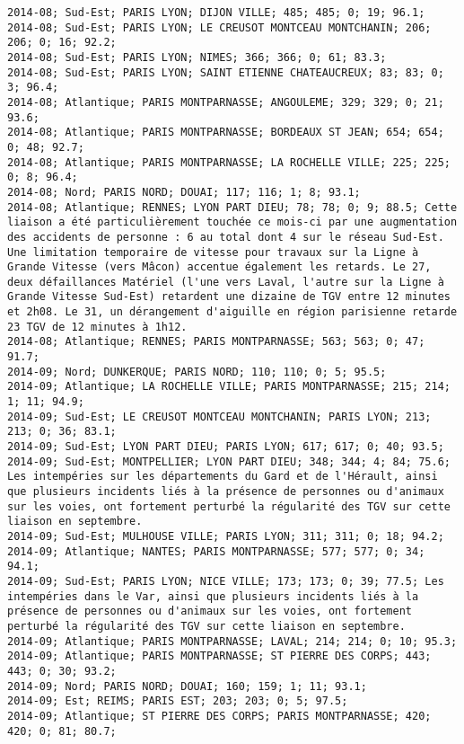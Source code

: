 \documentclass{article}
\begin{document}
\begin{Verbatim}[commandchars=\\\{\}]
2014-08; Sud-Est; PARIS LYON; DIJON VILLE; 485; 485; 0; 19; 96.1; 
2014-08; Sud-Est; PARIS LYON; LE CREUSOT MONTCEAU MONTCHANIN; 206; 206; 0; 16; 92.2; 
2014-08; Sud-Est; PARIS LYON; NIMES; 366; 366; 0; 61; 83.3; 
2014-08; Sud-Est; PARIS LYON; SAINT ETIENNE CHATEAUCREUX; 83; 83; 0; 3; 96.4; 
2014-08; Atlantique; PARIS MONTPARNASSE; ANGOULEME; 329; 329; 0; 21; 93.6; 
2014-08; Atlantique; PARIS MONTPARNASSE; BORDEAUX ST JEAN; 654; 654; 0; 48; 92.7; 
2014-08; Atlantique; PARIS MONTPARNASSE; LA ROCHELLE VILLE; 225; 225; 0; 8; 96.4; 
2014-08; Nord; PARIS NORD; DOUAI; 117; 116; 1; 8; 93.1; 
2014-08; Atlantique; RENNES; LYON PART DIEU; 78; 78; 0; 9; 88.5; Cette liaison a été particulièrement touchée ce mois-ci par une augmentation des accidents de personne : 6 au total dont 4 sur le réseau Sud-Est. Une limitation temporaire de vitesse pour travaux sur la Ligne à Grande Vitesse (vers Mâcon) accentue également les retards. Le 27, deux défaillances Matériel (l'une vers Laval, l'autre sur la Ligne à Grande Vitesse Sud-Est) retardent une dizaine de TGV entre 12 minutes et 2h08. Le 31, un dérangement d'aiguille en région parisienne retarde 23 TGV de 12 minutes à 1h12. 
2014-08; Atlantique; RENNES; PARIS MONTPARNASSE; 563; 563; 0; 47; 91.7; 
2014-09; Nord; DUNKERQUE; PARIS NORD; 110; 110; 0; 5; 95.5; 
2014-09; Atlantique; LA ROCHELLE VILLE; PARIS MONTPARNASSE; 215; 214; 1; 11; 94.9; 
2014-09; Sud-Est; LE CREUSOT MONTCEAU MONTCHANIN; PARIS LYON; 213; 213; 0; 36; 83.1; 
2014-09; Sud-Est; LYON PART DIEU; PARIS LYON; 617; 617; 0; 40; 93.5; 
2014-09; Sud-Est; MONTPELLIER; LYON PART DIEU; 348; 344; 4; 84; 75.6; Les intempéries sur les départements du Gard et de l'Hérault, ainsi que plusieurs incidents liés à la présence de personnes ou d'animaux sur les voies, ont fortement perturbé la régularité des TGV sur cette liaison en septembre.
2014-09; Sud-Est; MULHOUSE VILLE; PARIS LYON; 311; 311; 0; 18; 94.2; 
2014-09; Atlantique; NANTES; PARIS MONTPARNASSE; 577; 577; 0; 34; 94.1; 
2014-09; Sud-Est; PARIS LYON; NICE VILLE; 173; 173; 0; 39; 77.5; Les intempéries dans le Var, ainsi que plusieurs incidents liés à la présence de personnes ou d'animaux sur les voies, ont fortement perturbé la régularité des TGV sur cette liaison en septembre.
2014-09; Atlantique; PARIS MONTPARNASSE; LAVAL; 214; 214; 0; 10; 95.3; 
2014-09; Atlantique; PARIS MONTPARNASSE; ST PIERRE DES CORPS; 443; 443; 0; 30; 93.2; 
2014-09; Nord; PARIS NORD; DOUAI; 160; 159; 1; 11; 93.1; 
2014-09; Est; REIMS; PARIS EST; 203; 203; 0; 5; 97.5; 
2014-09; Atlantique; ST PIERRE DES CORPS; PARIS MONTPARNASSE; 420; 420; 0; 81; 80.7; 

\end{Verbatim}
\end{document}
